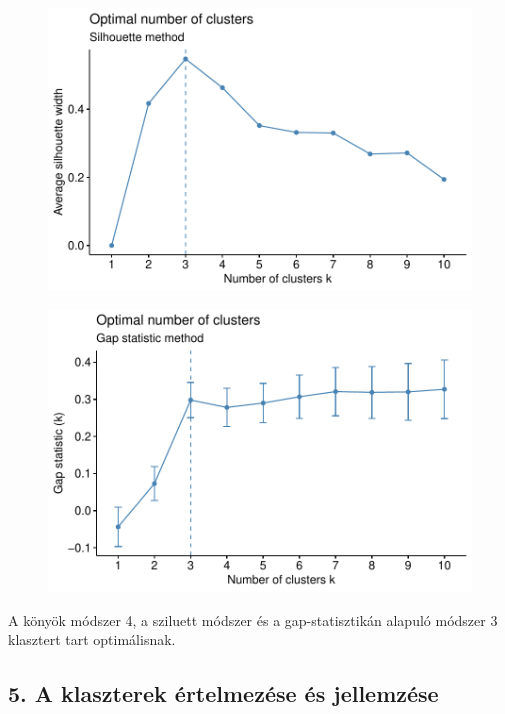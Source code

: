 \documentclass[
  letterpaper,
]{krantz}
\begin{document}
\begin{figure}[H]

{\centering \includegraphics{./sec_klaszter_files/figure-pdf/unnamed-chunk-9-2.pdf}

}

\end{figure}

\begin{figure}[H]

{\centering \includegraphics{./sec_klaszter_files/figure-pdf/unnamed-chunk-9-3.pdf}

}

\end{figure}

A könyök módszer 4, a sziluett módszer és a gap-statisztikán alapuló
módszer 3 klasztert tart optimálisnak.

\hypertarget{a-klaszterek-uxe9rtelmezuxe9se-uxe9s-jellemzuxe9se}{%
\subsection{5. A klaszterek értelmezése és
jellemzése}\label{a-klaszterek-uxe9rtelmezuxe9se-uxe9s-jellemzuxe9se}}
\end{document}
